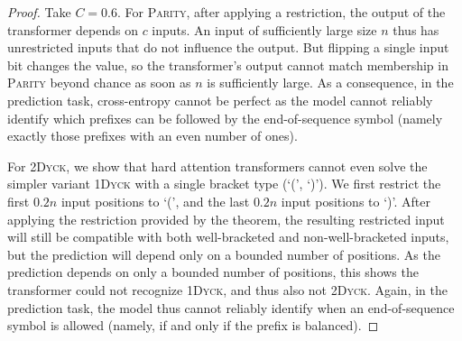 \documentclass[11pt,a4paper]{article}
\newcounter{theorem}
\newtheorem{corollary}[theorem]{Corollary}
\begin{document}
\begin{proof}
Take $C=0.6$.
For \textsc{Parity}, after applying a restriction, the output of the transformer depends on $c$ inputs.
An input of sufficiently large size $n$ thus has unrestricted inputs that do not influence the output.
But flipping a single input bit changes the value, so the transformer's output cannot match membership in \textsc{Parity} beyond chance as soon as $n$ is sufficiently large.
As a consequence, in the prediction task, cross-entropy cannot be perfect as the model cannot reliably identify which prefixes can be followed by the end-of-sequence symbol (namely exactly those prefixes with an even number of ones). 


For \textsc{2Dyck}, we show that hard attention transformers cannot even solve the simpler variant \textsc{1Dyck} with a single bracket type (`(', `)').
We first restrict the first $0.2n$ input positions to `(', and the last $0.2n$ input positions to `)'.
After applying the restriction provided by the theorem, the resulting restricted input will still be compatible with both well-bracketed and non-well-bracketed inputs, but the prediction will depend only on a bounded number of positions.
As the prediction depends on only a bounded number of positions, this shows the transformer could not recognize \textsc{1Dyck}, and thus also not \textsc{2Dyck}.
Again, in the prediction task, the model thus cannot reliably identify when an end-of-sequence symbol is allowed (namely, if and only if the prefix is balanced).
%
\end{proof}

\end{document}
